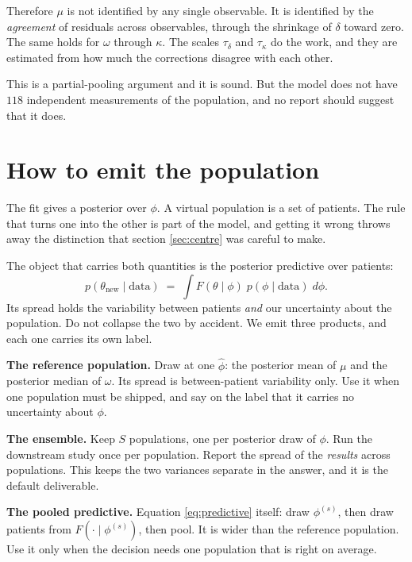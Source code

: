 \documentclass[11pt]{article}
\begin{document}
Therefore $\mu$ is not identified by any single observable. It is identified by
the \emph{agreement} of residuals across observables, through the shrinkage of
$\delta$ toward zero. The same holds for $\omega$ through $\kappa$. The scales
$\tau_\delta$ and $\tau_\kappa$ do the work, and they are estimated from how
much the corrections disagree with each other.

This is a partial-pooling argument and it is sound. But the model does not have
$118$ independent measurements of the population, and no report should suggest
that it does.

\section{How to emit the population}
\label{sec:emit}

The fit gives a posterior over $\phi$. A virtual population is a set of patients.
The rule that turns one into the other is part of the model, and getting it wrong
throws away the distinction that section \ref{sec:centre} was careful to make.

The object that carries both quantities is the posterior predictive over
patients:
\begin{equation}
p(\theta_{\text{new}}\mid \text{data})
\;=\;\int F(\theta\mid\phi)\;p(\phi\mid\text{data})\;d\phi .
\label{eq:predictive}
\end{equation}
Its spread holds the variability between patients \emph{and} our uncertainty
about the population. Do not collapse the two by accident. We emit three
products, and each one carries its own label.

\textbf{The reference population.} Draw at one $\hat\phi$: the posterior mean of
$\mu$ and the posterior median of $\omega$. Its spread is between-patient
variability only. Use it when one population must be shipped, and say on the
label that it carries no uncertainty about $\phi$.

\textbf{The ensemble.} Keep $S$ populations, one per posterior draw of $\phi$.
Run the downstream study once per population. Report the spread of the
\emph{results} across populations. This keeps the two variances separate in the
answer, and it is the default deliverable.

\textbf{The pooled predictive.} Equation \eqref{eq:predictive} itself: draw
$\phi^{(s)}$, then draw patients from $F(\cdot\mid\phi^{(s)})$, then pool. It is
wider than the reference population. Use it only when the decision needs one
population that is right on average.
\end{document}
